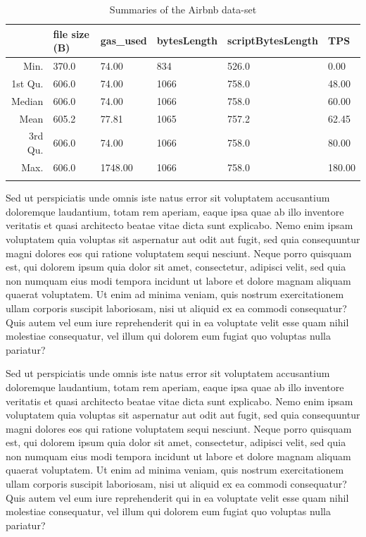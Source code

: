 \documentclass[10pt, conference, compsocconf]{IEEEtran}
\begin{document}
\begin{table}[ht]
  \caption{Summaries of the Airbnb data-set}
  \centering
  \begin{tabular}{rlllll}
    \hline
   &    file size (B) &    gas\_used &    bytesLength & scriptBytesLength & TPS \\ 
    \hline
    Min. &    370.0   &  74.00   &  834   & 526.0  & 0.00 \\ 
    1st Qu. & 606.0   &  74.00   & 1066   & 758.0 & 48.00  \\ 
    Median & 606.0   & 74.00   & 1066   & 758.0 & 60.00 \\ 
    Mean &    605.2   & 77.81   & 1065   & 757.2 & 62.45 \\ 
    3rd Qu. & 606.0   &  74.00   & 1066   & 758.0 & 80.00 \\ 
    Max. &    606.0   & 1748.00   & 1066   & 758.0 & 180.00 \\ 
    \hline
    \label{tab:df-statitistics}   
  \end{tabular}
\end{table}

Sed ut perspiciatis unde omnis iste natus error sit voluptatem accusantium doloremque laudantium, totam rem aperiam, eaque ipsa quae ab illo inventore veritatis et quasi architecto beatae vitae dicta sunt explicabo. 
Nemo enim ipsam voluptatem quia voluptas sit aspernatur aut odit aut fugit, sed quia consequuntur magni dolores eos qui ratione voluptatem sequi nesciunt. Neque porro quisquam est, qui dolorem ipsum quia dolor sit amet, consectetur, adipisci velit, sed quia non numquam eius modi tempora incidunt ut labore et dolore magnam aliquam quaerat voluptatem. 
Ut enim ad minima veniam, quis nostrum exercitationem ullam corporis suscipit laboriosam, nisi ut aliquid ex ea commodi consequatur? Quis autem vel eum iure reprehenderit qui in ea voluptate velit esse quam nihil molestiae consequatur, vel illum qui dolorem eum fugiat quo voluptas nulla pariatur?

Sed ut perspiciatis unde omnis iste natus error sit voluptatem accusantium doloremque laudantium, totam rem aperiam, eaque ipsa quae ab illo inventore veritatis et quasi architecto beatae vitae dicta sunt explicabo. 
Nemo enim ipsam voluptatem quia voluptas sit aspernatur aut odit aut fugit, sed quia consequuntur magni dolores eos qui ratione voluptatem sequi nesciunt. Neque porro quisquam est, qui dolorem ipsum quia dolor sit amet, consectetur, adipisci velit, sed quia non numquam eius modi tempora incidunt ut labore et dolore magnam aliquam quaerat voluptatem. 
Ut enim ad minima veniam, quis nostrum exercitationem ullam corporis suscipit laboriosam, nisi ut aliquid ex ea commodi consequatur? Quis autem vel eum iure reprehenderit qui in ea voluptate velit esse quam nihil molestiae consequatur, vel illum qui dolorem eum fugiat quo voluptas nulla pariatur?
\end{document}
